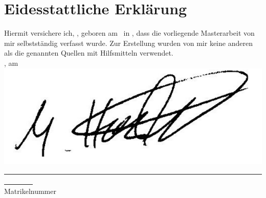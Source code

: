 \section*{Eidesstattliche Erklärung}
\medskip

Hiermit versichere ich, \theauthor, geboren am \authorBirthDate\ in \authorBirthCity, dass die vorliegende Masterarbeit von mir selbstständig verfasst wurde.
Zur Erstellung wurden von mir keine anderen als die genannten Quellen mit Hilfsmitteln verwendet.\\[1cm]

\signaturecity, am \signaturedate\\

\includegraphics[scale=0.5]{img/Unterschrift.png}\hspace{4cm}\matrikelnummer\\
\underline{~~~~~~~~~~~~~~~~~~~~~~~~~~~~~~~~~~~~~~~~}\hspace{4cm}\underline{~~~~~~~~~~~~~~~~~~~~~~~~~~~~~~~~~~~~~~~~}\\
\theauthor\hfill Matrikelnummer\hspace{1.9cm}